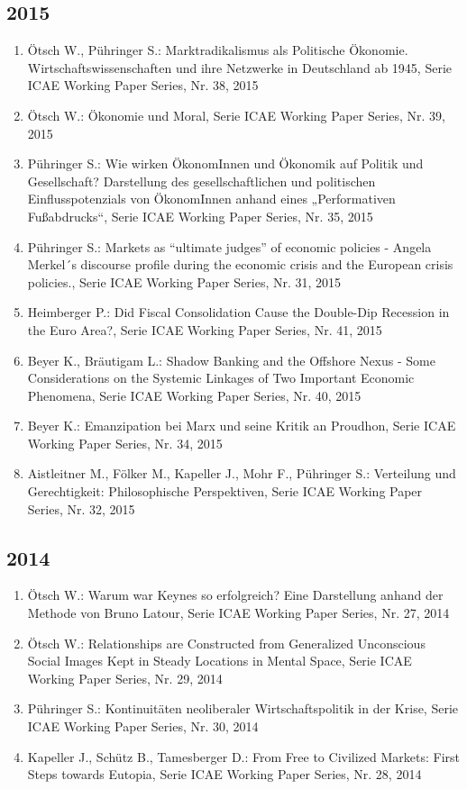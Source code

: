 \subsection*{2015}
\begin{enumerate}
    	 \item Ötsch W., Pühringer S.: Marktradikalismus als Politische Ökonomie. Wirtschaftswissenschaften und ihre Netzwerke in Deutschland ab 1945, Serie ICAE Working Paper Series, Nr. 38, 2015
	 \item Ötsch W.: Ökonomie und Moral, Serie ICAE Working Paper Series, Nr. 39, 2015
	 \item Pühringer S.: Wie wirken ÖkonomInnen und Ökonomik auf Politik und Gesellschaft? Darstellung des gesellschaftlichen und politischen Einflusspotenzials von ÖkonomInnen anhand eines „Performativen Fußabdrucks“, Serie ICAE Working Paper Series, Nr. 35, 2015
	 \item Pühringer S.: Markets as “ultimate judges” of economic policies - Angela Merkel´s discourse profile during the economic crisis and the European crisis policies., Serie ICAE Working Paper Series, Nr. 31, 2015
	 \item Heimberger P.: Did Fiscal Consolidation Cause the Double-Dip Recession in the Euro Area?, Serie ICAE Working Paper Series, Nr. 41, 2015
	 \item Beyer K., Bräutigam L.: Shadow Banking and the Offshore Nexus - Some Considerations on the Systemic Linkages of Two Important Economic Phenomena, Serie ICAE Working Paper Series, Nr. 40, 2015
	 \item Beyer K.: Emanzipation bei Marx und seine Kritik an Proudhon, Serie ICAE Working Paper Series, Nr. 34, 2015
	 \item Aistleitner M., Fölker M., Kapeller J., Mohr F., Pühringer S.: Verteilung und Gerechtigkeit: Philosophische Perspektiven, Serie ICAE Working Paper Series, Nr. 32, 2015
\end{enumerate}
\subsection*{2014}
\begin{enumerate}
    	 \item Ötsch W.: Warum war Keynes so erfolgreich? Eine Darstellung anhand der Methode von Bruno Latour, Serie ICAE Working Paper Series, Nr. 27, 2014
	 \item Ötsch W.: Relationships are Constructed from Generalized Unconscious Social Images Kept in Steady Locations in Mental Space, Serie ICAE Working Paper Series, Nr. 29, 2014
	 \item Pühringer S.: Kontinuitäten neoliberaler Wirtschaftspolitik in der Krise, Serie ICAE Working Paper Series, Nr. 30, 2014
	 \item Kapeller J., Schütz B., Tamesberger D.: From Free to Civilized Markets: First Steps towards Eutopia, Serie ICAE Working Paper Series, Nr. 28, 2014
\end{enumerate}
